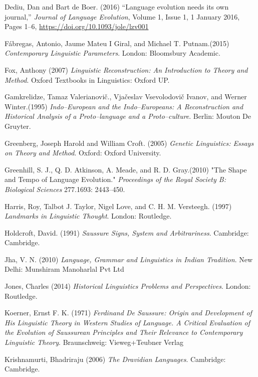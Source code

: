 \begin{thebibliography}{99}
  Dediu, Dan and Bart de Boer. (2016) “Language evolution needs its own journal,” \textit{Journal of Language Evolution}, Volume 1, Issue 1, 1 January 2016, Pages 1–6, \url{https://doi.org/10.1093/jole/lzv001}

  Fábregas, Antonio, Jaume Mateu I Giral, and Michael T. Putnam.(2015) \textit{Contemporary Linguistic Parameters}. London: Bloomsbury Academic.

  Fox, Anthony (2007) \textit{Linguistic Reconstruction: An Introduction to Theory and Method}. Oxford Textbooks in Linguistics: Oxford UP.

  Gamkrelidze, Tamaz Valerianovič., Vjačeslav Vsevolodovič Ivanov, and Werner Winter.(1995) \textit{Indo–European and the Indo–Europeans: A Reconstruction and Historical Analysis of a Proto–language and a Proto–culture}. Berlin: Mouton De Gruyter.

  Greenberg, Joseph Harold and William Croft. (2005) \textit{Genetic Linguistics: Essays on Theory and Method}. Oxford: Oxford University.

  Greenhill, S. J., Q. D. Atkinson, A. Meade, and R. D. Gray.(2010) "The Shape and Tempo of Language Evolution." \textit{Proceedings of the Royal Society B: Biological Sciences} 277.1693: 2443–450.

  Harris, Roy, Talbot J. Taylor, Nigel Love, and C. H. M. Versteegh. (1997) \textit{Landmarks in Linguistic Thought}. London: Routledge.

  Holdcroft, David. (1991) \textit{Saussure Signs, System and Arbitrariness}. Cambridge: Cambridge.

  Jha, V. N. (2010) \textit{Language, Grammar and Linguistics in Indian Tradition}. New Delhi: Munshiram Manoharlal Pvt Ltd

  Jones, Charles (2014)\textit{ Historical Linguistics Problems and Perspectives}. London: Routledge.

  Koerner, Ernst F. K. (1971) \textit{Ferdinand De Saussure: Origin and Development of His Linguistic Theory in Western Studies of Language. A Critical Evaluation of the Evolution of Saussurean Principles and Their Relevance to Contemporary Linguistic Theory}. Braunschweig: Vieweg+Teubner Verlag

  Krishnamurti, Bhadriraju (2006) \textit{The Dravidian Languages}. Cambridge: Cambridge.


\end{thebibliography}
